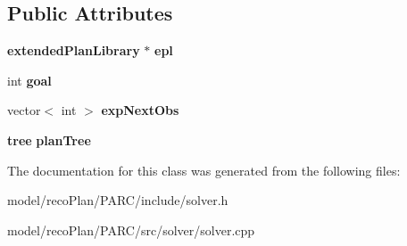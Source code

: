 \subsection*{Public Attributes}
\begin{DoxyCompactItemize}
\item 
\mbox{\label{classsolver_particle_a474cbf822017532e42fe641dd63370ef}} 
\textbf{ extended\+Plan\+Library} $\ast$ {\bfseries epl}
\item 
\mbox{\label{classsolver_particle_ac6455144f89db14fce27193d861066ab}} 
int {\bfseries goal}
\item 
\mbox{\label{classsolver_particle_a3fdf0c071a78a83ab49cc60cbc9a2d06}} 
vector$<$ int $>$ {\bfseries exp\+Next\+Obs}
\item 
\mbox{\label{classsolver_particle_a0e2950fe5ea4b71b686ae4986919327e}} 
\textbf{ tree} {\bfseries plan\+Tree}
\end{DoxyCompactItemize}


The documentation for this class was generated from the following files\+:\begin{DoxyCompactItemize}
\item 
model/reco\+Plan/\+P\+A\+R\+C/include/solver.\+h\item 
model/reco\+Plan/\+P\+A\+R\+C/src/solver/solver.\+cpp\end{DoxyCompactItemize}
